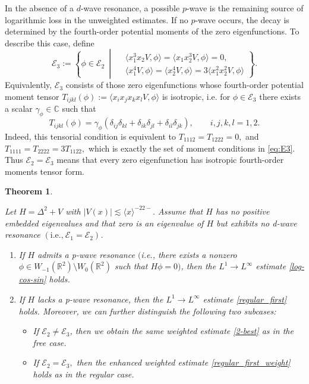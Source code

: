 \documentclass[reqno]{amsart}
\newtheorem{theorem}{Theorem}[section]
\numberwithin{equation}{section}
\begin{document}
In the absence of a $d$-wave resonance, a possible $p$-wave  is the remaining source of logarithmic loss in the unweighted estimates. If no $p$-wave  occurs, the decay  is determined by the fourth-order potential moments of the zero eigenfunctions. 
To describe this case, define
\begin{equation}\label{eq:E3}
	\mathcal{E}_3
	:=
	\left\{
	\phi\in\mathcal{E}_2
	\ \middle|\
	\begin{aligned}
		&
		\langle x_1^3x_2V,\phi\rangle
		=
		\langle x_1x_2^3V,\phi\rangle
		=
		0,
		\\
		&
		\langle x_1^4V,\phi\rangle
		=
		\langle x_2^4V,\phi\rangle
		=
		3\langle x_1^2x_2^2V,\phi\rangle
	\end{aligned}
	\right\}.
\end{equation}
Equivalently, $\mathcal{E}_3$ consists of those zero eigenfunctions
whose fourth-order potential moment tensor
$
T_{ijkl}(\phi)
:=
\langle x_ix_jx_kx_lV,\phi\rangle
$
is isotropic, i.e. for $\phi\in\mathcal{E}_3$ there
exists a scalar $\gamma_\phi\in\mathbb C$ such that
\[
T_{ijkl}(\phi)
=
\gamma_\phi
\left(
\delta_{ij}\delta_{kl}
+
\delta_{ik}\delta_{jl}
+
\delta_{il}\delta_{jk}
\right),
\qquad
 i,j,k,l=1,2.
\]
Indeed,  this tensorial condition is equivalent to
$
T_{1112}=T_{1222}=0,$ and
$
T_{1111}=T_{2222}=3T_{1122},
$
which is exactly the set of moment conditions in
\eqref{eq:E3}. Thus
$
\mathcal{E}_2=\mathcal{E}_3
$
means that every zero eigenfunction has isotropic fourth-order moments tensor form.


\begin{theorem}\label{main_theorem-32}


Let $H = \Delta^2 + V$ with $|V(x)| \lesssim \langle x \rangle^{-22-}$.   
	Assume that $H$ has no positive embedded eigenvalues and that zero is an eigenvalue of $H$ but exhibits no d-wave resonance $(\text{i.e.,}\  \mathcal{E}_1 = \mathcal{E}_2 )$.  
	\begin{enumerate}   
		\item If $H$ admits a p-wave resonance $($i.e., there exists a nonzero $\phi \in W_{-1}(\mathbb{R}^2) \setminus W_0(\mathbb{R}^2)$ such that $H\phi = 0 )$, then the $L^1 \to L^{\infty}$ estimate \eqref{log-cos-sin}  holds. 
		\vskip0.2cm
		\item If $H$ lacks a p-wave resonance, then  the $L^1 \to L^{\infty}$ estimate \eqref{regular_first} holds.  
		Moreover, we can  further distinguish the following two subcases:
		\begin{itemize}
			\item If $\mathcal{E}_2\neq \mathcal{E}_3$, then we obtain  the same weighted estimate \eqref{2-best}  as in the free case. 
			\vskip0.1cm
			\item If $\mathcal{E}_2=\mathcal{E}_3,$ then the  enhanced weighted estimate \eqref{regular_first_weight} holds as in the regular case.
		\end{itemize}  
	\end{enumerate}    
\end{theorem}  
\end{document}
